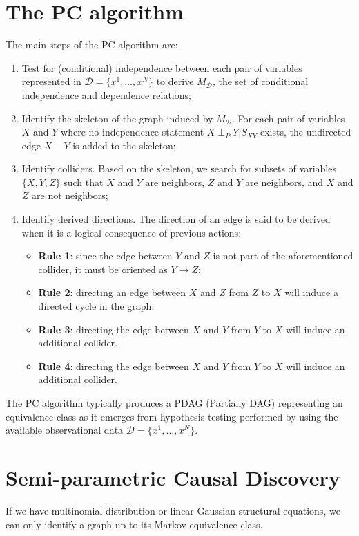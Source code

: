 \section{The PC algorithm}
The main steps of the PC algorithm are:
\begin{enumerate}
    \item Test for (conditional) independence between each pair of variables
          represented in $\mathcal{D} = \{x^1, \dots, x^N\}$ to derive $M_\mathcal{D}$,
          the set of conditional independence and dependence relations;
    \item Identify the skeleton of the graph induced by $M_\mathcal{D}$. For each
          pair of variables $X$ and $Y$ where no independence statement $X \perp_{P} Y | S_{XY}$
          exists, the undirected edge $X - Y$ is added to the skeleton;
    \item Identify colliders. Based on the skeleton, we search for subsets of variables $\{X, Y, Z\}$
          such that $X$ and $Y$ are neighbors, $Z$ and $Y$ are neighbors, and
          $X$ and $Z$ are not neighbors;
    \item Identify derived directions. The direction of an edge is said to be
          derived when it is a logical consequence of previous actions:
          \begin{itemize}
              \item \textbf{Rule 1}: since the edge between $Y$ and $Z$ is not part
                    of the aforementioned collider, it must be oriented as $Y \rightarrow Z$;
              \item \textbf{Rule 2}: directing an edge between $X$ and $Z$ from $Z$
                    to $X$ will induce a directed cycle in the graph.
              \item \textbf{Rule 3}: directing the edge between $X$ and $Y$ from
                    $Y$ to $X$ will induce an additional collider.
              \item \textbf{Rule 4}: directing the edge between $X$ and $Y$ from
                    $Y$ to $X$ will induce an additional collider.
          \end{itemize}
\end{enumerate}

The PC algorithm typically produces a PDAG (Partially DAG) representing an equivalence
class as it emerges from hypothesis testing performed by using the available
observational data $\mathcal{D} = \{x^1, \dots, x^N\}$.

\section{Semi-parametric Causal Discovery}
\begin{definition}
    If we have multinomial distribution or linear Gaussian structural equations,
    we can only identify a graph up to its Markov equivalence class.
\end{definition}

